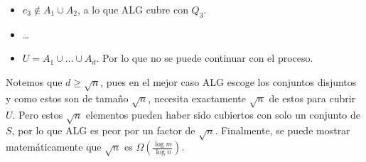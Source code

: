 \documentclass[dcc,uchile]{fcfmcourse}
\begin{document}
\begin{problems}
\begin{enumerate}[a)]
\begin{itemize}
        \item $e_{3} \not \in A_{1} \cup A_{2}$, a lo que ALG cubre con $Q_{3}$.
        \item \ldots
        \item $U = A_{1} \cup \ldots \cup A_{d}$. Por lo que no se puede continuar con el proceso.
    \end{itemize}
    Notemos que $d\ge \sqrt{n}$, pues en el mejor caso ALG escoge los conjuntos disjuntos y como estos son de tamaño $\sqrt{n}$, necesita exactamente $\sqrt{n}$ de estos para cubrir $U$. Pero estos $\sqrt{n}$ elementos pueden haber sido cubiertos con solo un conjunto de $S$, por lo que ALG es peor por un factor de $\sqrt{n}$. Finalmente, se puede mostrar matemáticamente que $\sqrt{n}$ es $\Omega\left(\frac{\log m}{\log n}\right)$.
\end{enumerate}
\end{problems}
\end{document}
